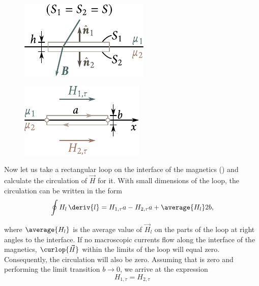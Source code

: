 \begin{figure}[!htb]
	\begin{minipage}[t]{0.48\linewidth}
		\begin{center}
			\includegraphics[scale=1]{figures/ch_07/fig_7_5.pdf}
			\caption[]{}
			\label{fig:7_5}
		\end{center}
	\end{minipage}
	\hfill{ }%
	\begin{minipage}[t]{0.48\linewidth}
		\begin{center}
			\includegraphics[scale=1]{figures/ch_07/fig_7_6.pdf}
			\caption[]{}
			\label{fig:7_6}
		\end{center}
	\end{minipage}
\vspace{-0.4cm}
\end{figure}

Now let us take a rectangular loop on the interface of the magnetics () and calculate the circulation of $\vec{H}$ for it.
With small dimensions of the loop, the circulation can be written in the form
\begin{equation}\label{eq:7_34}
    \oint H_l\, \deriv{l} = H_{1,\tau} a - H_{2,\tau} a + \average{H_l} 2b,
\end{equation}

\noindent
where $\average{H_l}$ is the average value of $\vec{H}_l$ on the parts of the loop at right angles to the interface.
If no macroscopic currents flow along the interface of the magnetics, $\curlop{\vec{H}}$ within the limits of the loop will equal zero.
Consequently, the circulation will also be zero.
Assuming that  is zero and performing the limit transition $b\to 0$, we arrive at the expression
\begin{equation}\label{eq:7_35}
    H_{1,\tau} = H_{2,\tau}
\end{equation}

